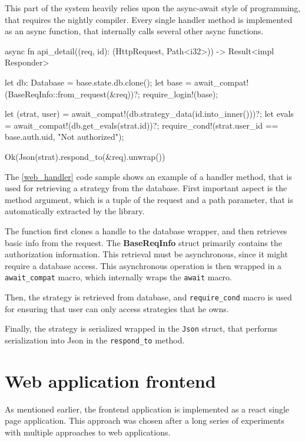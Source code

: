 This part of the system heavily relies upon the async-await style of programming, that requires the nightly compiler.
Every single handler method is implemented as an async function, that internally calls several other async functions.

\begin{code}[language=rust,label={web_handler},caption={Example web handler function}]
async fn api_detail((req, id): (HttpRequest, Path<i32>))
        -> Result<impl Responder> {
    let db: Database = base.state.db.clone();
    let base = await_compat!(BaseReqInfo::from_request(&req))?;
    require_login!(base);

    let (strat, user) = await_compat!(db.strategy_data(id.into_inner()))?;
    let evals = await_compat!(db.get_evals(strat.id))?;
    require_cond!(strat.user_id == base.auth.uid, "Not authorized");

    Ok(Json(strat).respond_to(&req).unwrap())
}
\end{code}

The \autoref{web_handler} code sample shows an example of a handler method, that is used for retrieving a strategy from the database.
First important aspect is the method argument, which is a tuple of the request and a path parameter, that is automatically extracted by
the library.

The function first clones a handle to the database wrapper, and then retrieves basic info from the request.
The \textbf{BaseReqInfo} struct primarily contains the authorization information. This retrieval must be asynchronous,
since it might require a database access. This asynchronous operation is then wrapped in a \verb|await_compat| macro, which internally wraps
the \verb|await| macro.

Then, the strategy is retrieved from database, and \verb|require_cond| macro is used for ensuring that user can only access strategies that he owns.

Finally, the strategy is serialized wrapped in the \verb|Json| struct, that performs serialization into Json in the
\verb|respond_to| method.

\section{Web application frontend}
As mentioned earlier, the frontend application is implemented as a react single page application.
This approach was chosen after a long series of experiments with multiple approaches to web applications.

